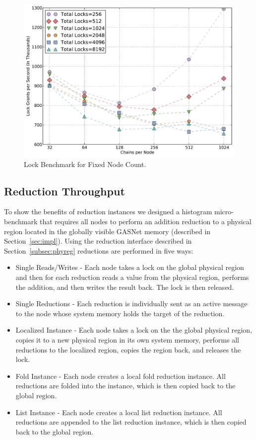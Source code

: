 \begin{figure}
\begin{center}
\includegraphics[scale=0.33]{figs/fixed_node_lock.pdf}
\end{center}
\vspace{-6mm}
\caption{Lock Benchmark for Fixed Node Count.\label{fig:fixednode}}
\vspace{-4mm}
\end{figure}


\subsection{Reduction Throughput}
\label{subsec:reducmicro}
To show the benefits of reduction instances we designed
a histogram micro-benchmark that requires all nodes to perform an addition reduction to a
physical region located in the globally visible GASNet memory (described in 
Section~\ref{sec:impl}).  Using the reduction interface described in Section~\ref{subsec:phyreg}
reductions are performed in five ways:

\begin{itemize} \itemsep1pt \parskip0pt 
\item Single Reads/Writes - Each node takes a lock on the global physical region and then for each reduction
reads a value from the physical region, performs the addition, and then writes the result back.  The lock is then released.
\item Single Reductions - Each reduction is individually sent as an active message to the node whose
system memory holds the target of the reduction.
\item Localized Instance - Each node takes a lock on the the global physical region, copies it to a new physical
region in its own system memory, performs all reductions to the localized region, copies the region back, and releases the lock.
\item Fold Instance - Each node creates a local fold reduction instance.
All reductions are folded into the instance, which is then copied back to the global region.
\item List Instance - Each node creates a local list reduction instance.
All reductions are appended to the list reduction instance, which is then copied back to the global region.
\end{itemize}

